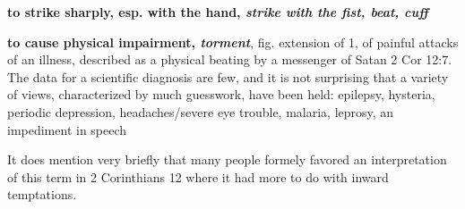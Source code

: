 				\begin{compactdesc}
					\item[BDAG 492a] \textbf{}
						\begin{compactitem}
							\item[1] \textbf{to strike sharply, esp. with the hand, \textit{strike with the fist, beat, cuff}}
							\item[2] \textbf{to cause physical impairment, \textit{torment}}, fig. extension of 1, of painful attacks of an illness, described as a physical beating by a messenger of Satan 2 Cor 12:7. The data for a scientific diagnosis are few, and it is not surprising that a variety of views, characterized by much guesswork, have been held: epilepsy, hysteria, periodic depression, headaches/severe eye trouble, malaria, leprosy, an impediment in speech
								\begin{compactitem}
									\item It does mention very briefly that many people formely favored an interpretation of this term in 2 Corinthians 12 where it had more to do with inward temptations.
								\end{compactitem}
						\end{compactitem}
				\end{compactdesc}
				
				
				
		
